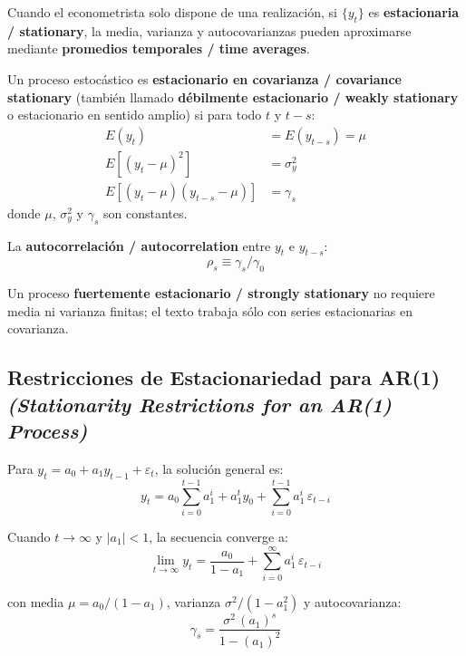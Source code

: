 \documentclass[12pt]{article}
\begin{document}
Cuando el econometrista solo dispone de una realizaci\'on, si $\{y_t\}$ es \textbf{estacionaria / stationary}, la media, varianza y autocovarianzas pueden aproximarse mediante \textbf{promedios temporales / time averages}.

Un proceso estoc\'astico es \textbf{estacionario en covarianza / covariance stationary} (tambi\'en llamado \textbf{d\'ebilmente estacionario / weakly stationary} o estacionario en sentido amplio) si para todo $t$ y $t - s$:
\begin{align}
E(y_t) &= E(y_{t-s}) = \mu \label{e:mu}\\
E\!\left[(y_t-\mu)^2\right] &= \sigma_y^2 \label{e:var}\\
E\!\left[(y_t-\mu)(y_{t-s}-\mu)\right] &= \gamma_s \label{e:cov}
\end{align}
donde $\mu$, $\sigma_y^2$ y $\gamma_s$ son constantes.

La \textbf{autocorrelaci\'on / autocorrelation} entre $y_t$ e $y_{t-s}$:
\begin{equation}
\rho_s \equiv \gamma_s / \gamma_0
\end{equation}

Un proceso \textbf{fuertemente estacionario / strongly stationary} no requiere media ni varianza finitas; el texto trabaja s\'olo con series estacionarias en covarianza.

\subsection{Restricciones de Estacionariedad para AR(1)\\
\textit{(Stationarity Restrictions for an AR(1) Process)}}

Para $y_t = a_0 + a_1 y_{t-1} + \varepsilon_t$, la soluci\'on general es:
\begin{equation}
y_t = a_0 \sum_{i=0}^{t-1} a_1^i + a_1^t y_0 + \sum_{i=0}^{t-1} a_1^i\,\varepsilon_{t-i}
\end{equation}

Cuando $t\to\infty$ y $|a_1|<1$, la secuencia converge a:
\begin{equation}
\lim_{t\to\infty} y_t = \frac{a_0}{1-a_1} + \sum_{i=0}^{\infty} a_1^i\,\varepsilon_{t-i}
\end{equation}

con media $\mu = a_0/(1-a_1)$, varianza $\sigma^2/(1-a_1^2)$ y autocovarianza:
\begin{equation}
\gamma_s = \frac{\sigma^2\,(a_1)^s}{1-(a_1)^2}
\end{equation}
\end{document}
